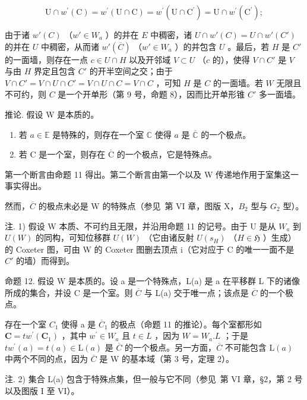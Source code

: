 \[
\mathrm{U} \cap w ^ {\prime} (\mathrm{C}) = w ^ {\prime} (\mathrm{U} \cap \mathrm{C}) = w ^ {\prime} (\mathrm{U} \cap \mathrm{C} ^ {\prime}) = \mathrm{U} \cap w ^ {\prime} (\mathrm{C} ^ {\prime});
\]

由于诸 \(w'(C)\) （\(w' \in W_a\) ）的并在 \(E\) 中稠密，诸 \(U \cap w'(C) = U \cap w'(C')\) 的并在 \(U\) 中稠密，从而诸 \(w'(\overline{C})\) （\(w' \in W_a\) ）的并包含 \(U\) 。最后，若 \(H\) 是 \(C'\) 的一面墙，则存在一点 \(c \in U \cap H\) 以及开邻域 \(V \subset U\) （\(c\) 的），使得 \(V \cap C'\) 是 \(V\) 与由 \(H\) 界定且包含 \(C'\) 的开半空间之交；由于 \(V \cap C' = V \cap U \cap C' = V \cap U \cap C = V \cap C\) ，可知 \(H\) 是 \(C\) 的一面墙。若 \(W\) 无限且不可约，则 \(C\) 是一个开单形（第 9 号，命题 8），因而比开单形锥 \(C'\) 多一面墙。

推论. 假设 W 是本质的。

\begin{enumerate}
\def\labelenumi{(\roman{enumi})}
\item
  若 \(a \in \mathbb{E}\) 是特殊的，则存在一个室 \(\mathbb{C}\) 使得 \(a\) 是 \(\overline{\mathbb{C}}\) 的一个极点。
\item
  若 \(\mathrm{C}\) 是一个室，则存在 \(\overline{\mathrm{C}}\) 的一个极点，它是特殊点。
\end{enumerate}

第一个断言由命题 11 得出。第二个断言由第一个以及 W 传递地作用于室集这一事实得出。

然而，\(\overline{C}\) 的极点未必是 W 的特殊点（参见~第 VI 章，图版 X，\(B_{2}\) 型与 \(G_{2}\) 型）。

注. 1) 假设 W 本质、不可约且无限，并沿用命题 11 的记号。由于 U 是从 \(W_{a}\) 到 \(U(W)\) 的同构，可知位移群 \(U(W)\) （它由诸反射 \(U(s_{H})\) （\(H \in \mathfrak{H}\) ）生成）的 Coxeter 图，可由 W 的 Coxeter 图删去顶点 i（它对应于 C 的唯一一面不是 \(C'\) 的墙）而得到。

命题 12. 假设 W 是本质的。设 a 是一个特殊点，L(a) 是 a 在平移群 L 下的诸像所成的集合，并设 C 是一个室。则 \(\overline{C}\) 与 L(a) 交于唯一点；该点是 \(\overline{C}\) 的一个极点。

存在一个室 \(C_{1}\) 使得 a 是 \(\overline{C}_{1}\) 的极点（命题 11 的推论）。每个室都形如 \(\mathbf{C}=tw^{\prime}(\mathbf{C}_{1})\) ，其中 \(w^{\prime}\in W_{a}\) 且 \(t\in L\) ，因为 \(W=W_{a}.L\) ；于是 \(tw^{\prime}(a)=t(a)\in\mathrm{L}(a)\) 是 \(\overline{C}\) 的一个极点。另一方面，\(\overline{C}\) 不可能包含 \(\mathrm{L}(a)\) 中两个不同的点，因为 \(\overline{C}\) 是 W 的基本域（第 3 号，定理 2）。

注. 2) 集合 L(a) 包含于特殊点集，但一般与它不同（参见~第 VI 章，§2，第 2 号以及图版 I 至 VI）。

